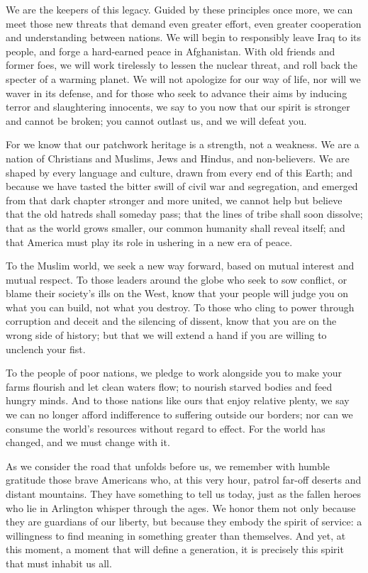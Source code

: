{We are the keepers of this legacy. Guided by these principles once more, we can meet those new threats that demand even greater effort, even greater cooperation and understanding between nations. We will begin to responsibly leave Iraq to its people, and forge a hard-earned peace in Afghanistan. With old friends and former foes, we will work tirelessly to lessen the nuclear threat, and roll back the specter of a warming planet. We will not apologize for our way of life, nor will we waver in its defense, and for those who seek to advance their aims by inducing terror and slaughtering innocents, we say to you now that our spirit is stronger and cannot be broken; you cannot outlast us, and we will defeat you.

For we know that our patchwork heritage is a strength, not a weakness. We are a nation of Christians and Muslims, Jews and Hindus, and non-believers. We are shaped by every language and culture, drawn from every end of this Earth; and because we have tasted the bitter swill of civil war and segregation, and emerged from that dark chapter stronger and more united, we cannot help but believe that the old hatreds shall someday pass; that the lines of tribe shall soon dissolve; that as the world grows smaller, our common humanity shall reveal itself; and that America must play its role in ushering in a new era of peace.

To the Muslim world, we seek a new way forward, based on mutual interest and mutual respect. To those leaders around the globe who seek to sow conflict, or blame their society's ills on the West, know that your people will judge you on what you can build, not what you destroy. To those who cling to power through corruption and deceit and the silencing of dissent, know that you are on the wrong side of history; but that we will extend a hand if you are willing to unclench your fist.

To the people of poor nations, we pledge to work alongside you to make your farms flourish and let clean waters flow; to nourish starved bodies and feed hungry minds. And to those nations like ours that enjoy relative plenty, we say we can no longer afford indifference to suffering outside our borders; nor can we consume the world's resources without regard to effect. For the world has changed, and we must change with it.

As we consider the road that unfolds before us, we remember with humble gratitude those brave Americans who, at this very hour, patrol far-off deserts and distant mountains. They have something to tell us today, just as the fallen heroes who lie in Arlington whisper through the ages. We honor them not only because they are guardians of our liberty, but because they embody the spirit of service: a willingness to find meaning in something greater than themselves. And yet, at this moment, a moment that will define a generation, it is precisely this spirit that must inhabit us all.

}
